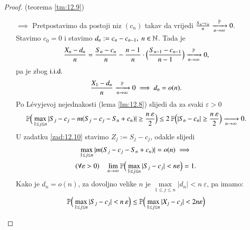 \begin{proof}{(teorema \ref{tm:12.9})}
    \begin{itemize}
        \item[$\implies$] Pretpostavimo da postoji niz $(c_n)$ takav da vrijedi $\frac{S_n - c_n}{n} \xrightarrow[n \to \infty]{\mathbb{P}} 0$.
        Stavimo $c_0 = 0$ i stavimo $d_n := c_n - c_{n - 1}, \; n \in \mathbb{N}$.
        Tada je
        \begin{equation*}
            \frac{X_n -d_n}{n} = \frac{S_n - c_n}{n} - \frac{n - 1}{n} \cdot \Big( \frac{S_{n - 1} - c_{n - 1}}{n - 1} \Big) \xrightarrow[n \to \infty]{\mathbb{P}} 0,
        \end{equation*}
        pa je zbog $\mathrm{i.i.d.}$
        \begin{equation*}
            \frac{X_1 - d_n}{n} \xrightarrow[n \to \infty]{\mathbb{P}} 0 \implies d_n = o(n).
        \end{equation*}
        Po L\' evyjevoj nejednakosti (lema \ref{lm:12.8}) slijedi da za svaki $\varepsilon > 0$
        \begin{equation*}
            \mathbb{P} \Big( \max\limits_{1 \leq j \leq n} | S_j - c_j -m( S_j - c_j - S_n + c_n) | \geq \frac{n \: \varepsilon}{2}  \Big)\leq 2 \: \mathbb{P} \Big( |S_n - c_n| \geq \frac{n \: \varepsilon}{2} \Big) \xrightarrow[n \to \infty]{} 0.
        \end{equation*}
        U zadatku \ref{zad:12.10} stavimo $Z_j := S_j - c_j$, odakle slijedi
        \begin{equation*}
            \begin{gathered}
                \max\limits_{1 \leq j \leq n} | m(S_j - c_j - S_n + c_n) | = o(n) \implies\\
                (\forall \varepsilon > 0) \quad \lim\limits_{n \to \infty} \mathbb{P} \Big( \max\limits_{1 \leq j \leq n} |S_j - c_j | < n \varepsilon \Big) = 1.
            \end{gathered}
        \end{equation*}
        Kako je $d_n = o(n)$, za dovoljno velike $n$ je $\max\limits_{1 \leq j \leq n} |d_n| < n \: \varepsilon$, pa imamo:
        \begin{equation*}
            \begin{gathered}
                \begin{aligned}
                    \masP \Big( \max\limits_{1 \leq j \leq n}  |S_j - c_j| < n \: \varepsilon \Big) &\leq \masP \Big( \max\limits_{1 \leq j \leq n} |X_j - c_j| < 2 n \varepsilon \Big)\\

\end{aligned}
\end{gathered}
\end{equation*}
\end{itemize}
\end{proof}
